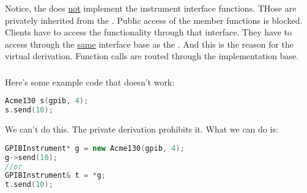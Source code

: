 Notice, the  does \underline{not} implement the instrument interface functions. THose are privately inherited from the . Public access of the member functions is blocked. Clients have to access the functionality through that interface. They have to access through the \underline{same} interface base as the . And this is the reason for the virtual derivation. Function calls are routed through the implementation base.



\subsubsection{}

Here's some example code that doesn't work:

\begin{lstlisting}[language=C++]
Acme130 s(gpib, 4);
s.send(10);
\end{lstlisting}

We can't do this. The private derivation prohibits it. What we can do is:

\begin{lstlisting}[language=C++]
GPIBInstrument* g = new Acme130(gpib, 4);
g->send(10);
//or
GPIBInstrument& t = *g;
t.send(10);
\end{lstlisting}


